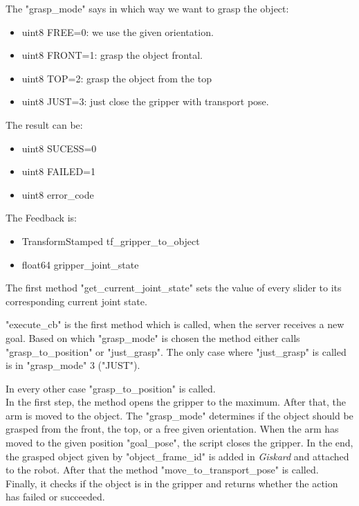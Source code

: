 \documentclass[main.tex]{subfiles}
\begin{document}
			\vspace{0,25 cm}
			The "grasp\_mode" says in which way we want to grasp the object:
			\begin{itemize}
			 \item uint8 FREE=0: we use the given orientation.
			 \item uint8 FRONT=1: grasp the object frontal.
			 \item uint8 TOP=2: grasp the object from the top
			 \item uint8 JUST=3: just close the gripper with transport pose.
			 \end{itemize}
			 \vspace{0,75 cm}
			 The result can be:
			 \begin{itemize}
			 	\item uint8 SUCESS=0
			 	\item uint8 FAILED=1
			 	\item uint8 error\_code
			 \end{itemize}
		 
			\vspace{0,75 cm}
			The Feedback is:
			\begin{itemize}
				\item TransformStamped tf\_gripper\_to\_object
				\item float64 gripper\_joint\_state
			\end{itemize}
			 
			 \vspace{0,75 cm}
			 The first method "get\_current\_joint\_state"  sets the value of every slider to its corresponding current joint state.
			 
			 \vspace{0,25 cm}
			 "execute\_cb" is the first method which is called, when the server receives a new goal. Based on which "grasp\_mode" is chosen the method either calls "grasp\_to\_position" or "just\_grasp". The only case where "just\_grasp" is called is in "grasp\_mode" 3 ("JUST").
			 
			 \vspace{0,25 cm}
			 In every other case "grasp\_to\_position" is called.\\
			In the first step, the method opens the gripper to the maximum. After that, the arm is moved to the object. The "grasp\_mode" determines if the object should be grasped from the front, the top, or a free given orientation. When the arm has moved to the given position "goal\_pose", the script closes the gripper. In the end, the grasped object given by "object\_frame\_id" is added in \textit{Giskard} and attached to the robot. After that the method "move\_to\_transport\_pose" is called.\\
			Finally, it checks if the object is in the gripper and returns whether the action has failed or succeeded.
			
\end{document}

